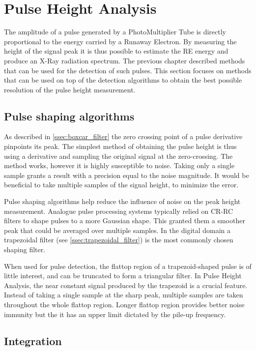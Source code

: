 \section{Pulse Height Analysis}

The amplitude of a pulse generated by a PhotoMultiplier Tube
is directly proportional to the energy carried by a Runaway 
Electron. By measuring the height of the signal peak 
it is thus possible to estimate the RE energy and
produce an X-Ray radiation spectrum. The previous chapter
described methods that can be used for the detection of such pulses.
This section focuses on methods that can be used on top of
the detection algorithms to obtain the best possible resolution 
of the pulse height measurement.

\subsection{Pulse shaping algorithms}
As described in \autoref{ssec:boxcar_filter} the zero crossing point 
of a pulse derivative pinpoints its peak.
The simplest method of obtaining the pulse height
is thus using a derivative and sampling the original signal
at the zero-crossing.
The method works, however it is highly susceptible to noise.
Taking only a single sample grants a result with a precision 
equal to the noise magnitude. It would be beneficial
to take multiple samples of the signal height, to minimize 
the error.


Pulse shaping algorithms help reduce the influence of noise
on the peak height measurement. Analogue pulse processing 
systems typically relied on CR-RC filters to shape 
pulses to a more Gaussian shape. This granted them 
a smoother peak that could be averaged over multiple samples.
In the digital domain a trapezoidal filter 
(see \autoref{ssec:trapezoidal_filter})
is the most commonly chosen shaping filter.


When used for pulse detection, the flattop region of
a trapezoid-shaped pulse is of little interest, and 
can be truncated to form a triangular filter. In Pulse Height
Analysis, the near constant signal produced
by the trapezoid is a crucial feature. 
Instead of taking a single sample at the sharp peak,
multiple samples are taken throughout the whole flattop region.
Longer flattop region provides better noise immunity but 
the it has an upper limit dictated by the pile-up frequency.

\subsection{Integration}


